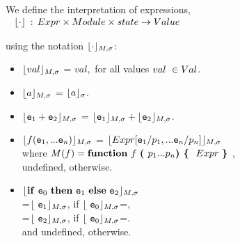 \begin{definition}[Interpretations]
We define the interpretation of expressions,
\noindent
$
\begin{array}{c}
\  {\lfloor{ {\cdot}}\rfloor_{}}\, : \, {{Expr}} \times   {Module} \times   {state}
\rightarrow {Value}
 \end{array}
$

\noindent
using the notation  ${\lfloor{ {\cdot}}\rfloor_{M,\sigma}}$: \\


\begin{itemize}
\item
 ${\lfloor{ {val}}\rfloor_{M,\sigma}} $    = $val$,\  for all values $val\ \in {Val}$.
\item
 ${\lfloor{ {a}}\rfloor_{M,\sigma}} $    = ${\lfloor{ {a{} }}\rfloor_{\sigma}}$.
\item  
  ${\lfloor{ {{{{\ensuremath{\textrm{\ttfamily{e}}}}}_1}+ {{{\ensuremath{\textrm{\ttfamily{e}}}}}_2}}}\rfloor_{M,\sigma}}$ =
 ${\lfloor{ {{{{\ensuremath{\textrm{\ttfamily{e}}}}}_1}}}\rfloor_{M,\sigma}} + {\lfloor{ {{{{\ensuremath{\textrm{\ttfamily{e}}}}}_2}}}\rfloor_{M,\sigma}}$.
 \item
  ${\lfloor{ {{f}({{{\ensuremath{\textrm{\ttfamily{e}}}}}_1},...{{{\ensuremath{\textrm{\ttfamily{e}}}}}_n})}}\rfloor_{M,\sigma}}$ =
 ${\lfloor{ {{{Expr}}[{{{\ensuremath{\textrm{\ttfamily{e}}}}}_1}/{p_1}, ... {{{\ensuremath{\textrm{\ttfamily{e}}}}}_n}/{p_n}]}}\rfloor_{M,\sigma}}$
 \\
   where
 $ M(f) =  {\bf {function}} ~{f}~\mbox{\tt{\bf{( }}}  {p_1}...{p_n}  \mbox{\tt{\bf{) }}}\mbox{\tt{\bf{\{ }}}~   {{Expr}}~ \mbox{\tt{\bf{\} }}} $,
 \\
 undefined, otherwise.

 \item
${\lfloor{ { {\bf {if}} ~{{{\ensuremath{\textrm{\ttfamily{e}}}}}_0} ~{\bf {then}} ~ {{{\ensuremath{\textrm{\ttfamily{e}}}}}_1} ~{\bf {else}} ~{{{\ensuremath{\textrm{\ttfamily{e}}}}}_2}}}\rfloor_{M,\sigma}} $\\
=${\lfloor{ { \ {{{\ensuremath{\textrm{\ttfamily{e}}}}}_1} }}\rfloor_{M,\sigma}} $, if ${\lfloor{ { \ {{{\ensuremath{\textrm{\ttfamily{e}}}}}_0} }}\rfloor_{M,\sigma}} $=, \\
=${\lfloor{ { \ {{{\ensuremath{\textrm{\ttfamily{e}}}}}_2} }}\rfloor_{M,\sigma}} $, if ${\lfloor{ { \ {{{\ensuremath{\textrm{\ttfamily{e}}}}}_0} }}\rfloor_{M,\sigma}} $=. \\
and undefined, otherwise.
\\
 \end{itemize}
 
\end{definition}

